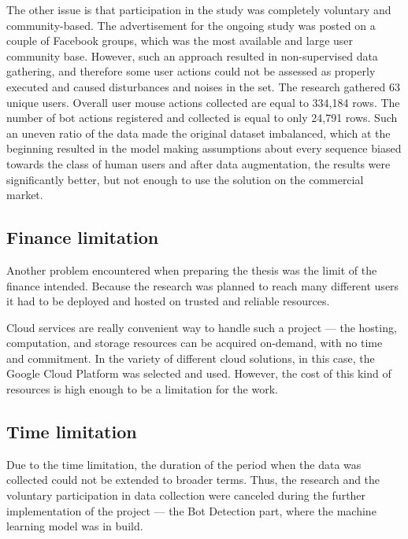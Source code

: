 The other issue is that participation in the study was completely voluntary and community-based.
The advertisement for the ongoing study was posted on a couple of Facebook groups, which was the most available and large user community base.
However, such an approach resulted in non-supervised data gathering, and therefore some user actions could not be assessed as properly executed and caused disturbances and noises in the set.
The research gathered 63 unique users.
Overall user mouse actions collected are equal to 334,184 rows.
The number of bot actions registered and collected is equal to only 24,791 rows.
Such an uneven ratio of the data made the original dataset imbalanced, which at the beginning resulted in the model making assumptions about every sequence biased towards the class of human users and after data augmentation, the results were significantly better, but not enough to use the solution on the commercial market.

\subsection{Finance limitation}\label{subsec:finance-limitation}
Another problem encountered when preparing the thesis was the limit of the finance intended.
Because the research was planned to reach many different users it had to be deployed and hosted on trusted and reliable resources.

Cloud services are really convenient way to handle such a project --- the hosting, computation, and storage resources can be acquired on-demand, with no time and commitment.
In the variety of different cloud solutions, in this case, the Google Cloud Platform was selected and used.
However, the cost of this kind of resources is high enough to be a limitation for the work.

\subsection{Time limitation}\label{subsec:time-limitation}
Due to the time limitation, the duration of the period when the data was collected could not be extended to broader terms.
Thus, the research and the voluntary participation in data collection were canceled during the further implementation of the project --- the Bot Detection part, where the machine learning model was in build.
